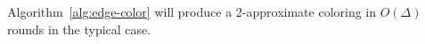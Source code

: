 \begin{thm}
Algorithm~\ref{alg:edge-color} will produce a 2-approximate coloring in $O(\Delta)$ rounds in the typical case.
\label{thm:edge-color}
\end{thm}
